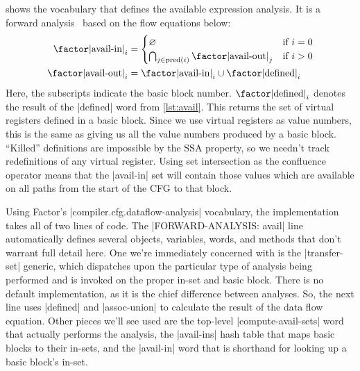  shows the vocabulary that defines the available expression
analysis.  It is a forward analysis~ based on the flow equations
below:
\begin{align*}
  \text{\factor|avail-in|}_i &=
    \begin{cases}
      \varnothing
        & \text{if $i=0$} \\
      \bigcap_{j\in\mathrm{pred}(i)}\text{\factor|avail-out|}_j
        & \text{if $i>0$}
    \end{cases} \\
  \text{\factor|avail-out|}_i &= \text{\factor|avail-in|}_i
                                 \cup 
                                 \text{\factor|defined|}_i
\end{align*}
%
\noindent Here, the subscripts indicate the basic block number.
$\text{\factor|defined|}_i$ denotes the result of the \factor|defined| word
from \vref{lst:avail}.  This returns the set of virtual registers defined in a
basic block.  Since we use virtual registers as value numbers, this is the same
as giving us all the value numbers produced by a basic block.  ``Killed''
definitions are impossible by the \gls{SSA} property, so we needn't track
redefinitions of any virtual register.  Using set intersection as the
confluence operator means that the \factor|avail-in| set will contain those
values which are available on all paths from the start of the \gls{CFG} to that
block.

Using Factor's \factor|compiler.cfg.dataflow-analysis| vocabulary, the
implementation takes all of two lines of code.  The
%
\factor|FORWARD-ANALYSIS: avail|
%
line automatically defines several objects, variables, words, and methods that
don't warrant full detail here.  One we're immediately concerned with is the
\factor|transfer-set| generic, which dispatches upon the particular type of
analysis being performed and is invoked on the proper in-set and basic block.
There is no default implementation, as it is the chief difference between
analyses.  So, the next line uses \factor|defined| and \factor|assoc-union| to
calculate the result of the data flow equation.  Other pieces we'll see used
are the top-level \factor|compute-avail-sets| word that actually performs the
analysis, the \factor|avail-ins| hash table that maps basic blocks to their
in-sets, and the \factor|avail-in| word that is shorthand for looking up a
basic block's in-set.

